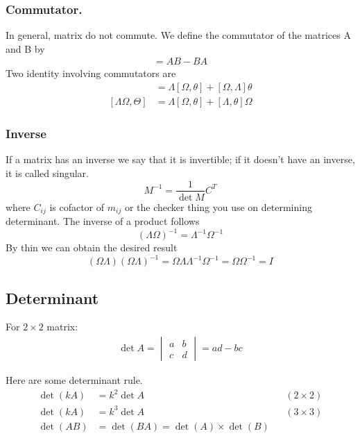 \documentclass[../main.tex]{subfiles}
\begin{document}
\subsubsection*{Commutator.}
In general, matrix do not commute. We define the commutator of the matrices A and B by
\begin{align*}
	[A, B] = AB - BA
\end{align*}
Two identity involving commutators are
\begin{align*}
	[\Omega,\Lambda\theta] & =\Lambda[\Omega,\theta]+[\Omega,\Lambda]\theta \\
	[\Lambda\Omega,\Theta] & =\Lambda[\Omega,\theta]+[\Lambda,\theta]\Omega
\end{align*}

\subsubsection*{Inverse}
If a matrix has an inverse we say that it is invertible; if it doesn't have an inverse, it is called singular.
\begin{equation*}
	M^{-1}=\frac{1}{\det M}C^{T}
\end{equation*}
where $C_{ij}$ is cofactor of $m_{ij}$ or the checker thing you use on determining determinant.
The inverse of a product follows
\begin{equation*}
	(\Lambda\Omega)^{-1}=\Lambda^{-1}\Omega^{-1}
\end{equation*}
By thin we can obtain the desired result
\begin{equation*}
	(\Omega\Lambda)(\Omega\Lambda)^{-1}=\Omega\Lambda\Lambda^{-1}\Omega^{-1}=\Omega\Omega^{-1}=I
\end{equation*}

\subsection*{Determinant} For $2\times 2$ matrix:
\begin{align*}
	\det A=\begin{vmatrix}
		       a & b \\
		       c & d
	       \end{vmatrix}=ad-bc
\end{align*}

Here are some determinant rule.
\begin{align*}
	\det(kA) & =k^2\det A                      &  & (2\times2) \\
	\det(kA) & =k^3\det A                      &  & (3\times3) \\
	\det(AB) & =\det(BA)=\det(A)\times\det (B)
\end{align*}
\end{document}
